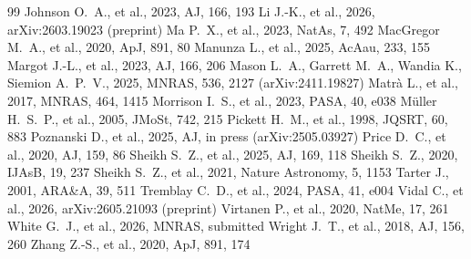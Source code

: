 \documentclass[twocolumn,twocolappendix]{openjournal}
\begin{document}
\begin{thebibliography}{99}
 Johnson O.~A., et al., 2023, AJ, 166, 193
 Li J.-K., et al., 2026, arXiv:2603.19023 (preprint)
 Ma P.~X., et al., 2023, NatAs, 7, 492
 MacGregor M.~A., et al., 2020, ApJ, 891, 80
 Manunza L., et al., 2025, AcAau, 233, 155
 Margot J.-L., et al., 2023, AJ, 166, 206
 Mason L.~A., Garrett M.~A., Wandia K., Siemion A.~P.~V., 2025, MNRAS, 536, 2127 (arXiv:2411.19827)
 Matrà L., et al., 2017, MNRAS, 464, 1415
 Morrison I.~S., et al., 2023, PASA, 40, e038
 M\"uller H.~S.~P., et al., 2005, JMoSt, 742, 215
 Pickett H.~M., et al., 1998, JQSRT, 60, 883
 Poznanski D., et al., 2025, AJ, in press (arXiv:2505.03927)
 Price D.~C., et al., 2020, AJ, 159, 86
 Sheikh S.~Z., et al., 2025, AJ, 169, 118
 Sheikh S.~Z., 2020, IJAsB, 19, 237
 Sheikh S.~Z., et al., 2021, Nature Astronomy, 5, 1153
 Tarter J., 2001, ARA\&A, 39, 511
 Tremblay C.~D., et al., 2024, PASA, 41, e004
 Vidal C., et al., 2026, arXiv:2605.21093 (preprint)
 Virtanen P., et al., 2020, NatMe, 17, 261
 White G.~J., et al., 2026, MNRAS, submitted
 Wright J.~T., et al., 2018, AJ, 156, 260
 Zhang Z.-S., et al., 2020, ApJ, 891, 174
\end{thebibliography}
\end{document}
